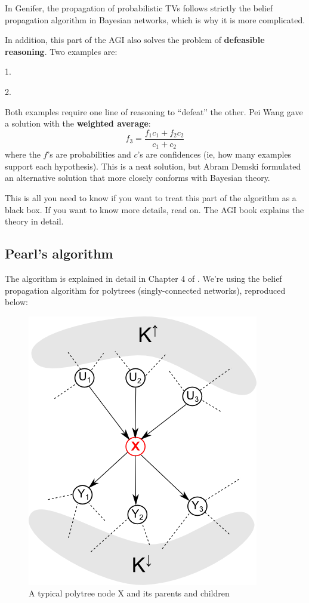 In Genifer, the propagation of probabilistic TVs follows strictly the belief propagation
algorithm in Bayesian networks, which is why it is more complicated.

In addition, this part of the AGI also solves the problem of \textbf{defeasible reasoning}.
Two examples are:

1.  

2.  

Both examples require one line of reasoning to ``defeat'' the other.  Pei Wang gave a
solution with the \textbf{weighted average}:
$$ f_3 = \frac{f_1 c_1 + f_2 c_2} {c_1 + c_2} $$
where the $f$'s are probabilities and $c$'s are confidences (ie, how many examples support each
hypothesis).  This is a neat solution, but Abram Demski formulated an alternative solution that
more closely conforms with Bayesian theory.

This is all you need to know if you want to treat this part of the algorithm as a black box.
If you want to know more details, read on.  The AGI book explains the theory in detail.

\subsection{Pearl's algorithm}

The algorithm is explained in detail in Chapter 4 of \citep*{Pearl1988}.  We're using the belief
propagation algorithm for polytrees (singly-connected networks), reproduced below:
\begin{figure}[h]
\centering
\includegraphics{polytree-typical-node.png}
\caption{A typical polytree node X and its parents and children}
\label{fig:polytree-typical-node}
\end{figure}

